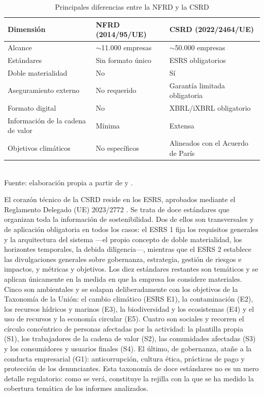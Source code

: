 \begin{table}[H]
\centering
\caption{Principales diferencias entre la NFRD y la CSRD}
\label{tab:nfrd-csrd}
\begin{tabular}{lll}
\toprule
\textbf{Dimensión} & \textbf{NFRD (2014/95/UE)} & \textbf{CSRD (2022/2464/UE)} \\
\midrule
Alcance & $\sim$11.000 empresas & $\sim$50.000 empresas \\
Estándares & Sin formato único & ESRS obligatorios \\
Doble materialidad & No & Sí \\
Aseguramiento externo & No requerido & Garantía limitada obligatoria \\
Formato digital & No & XBRL/iXBRL obligatorio \\
Información de la cadena de valor & Mínima & Extensa \\
Objetivos climáticos & No específicos & Alineados con el Acuerdo de París \\
\bottomrule
\end{tabular}
\\[4pt]
{\footnotesize Fuente: elaboración propia a partir de \textcite{nfrd2014} y \textcite{csrd2022}.}
\end{table}

El corazón técnico de la CSRD reside en los ESRS, aprobados mediante el Reglamento Delegado
(UE) 2023/2772 \parencite{esrs2023}. Se trata de doce estándares que organizan toda la
información de sostenibilidad. Dos de ellos son transversales y de aplicación obligatoria en
todos los casos: el ESRS 1 fija los requisitos generales y la arquitectura del sistema
—el propio concepto de doble materialidad, los horizontes temporales, la debida diligencia—,
mientras que el ESRS 2 establece las divulgaciones generales sobre gobernanza, estrategia,
gestión de riesgos e impactos, y métricas y objetivos. Los diez estándares restantes son
temáticos y se aplican únicamente en la medida en que la empresa los considere materiales.
Cinco son ambientales y se solapan deliberadamente con los objetivos de la Taxonomía de la
Unión: el cambio climático (ESRS E1), la contaminación (E2), los recursos hídricos y marinos
(E3), la biodiversidad y los ecosistemas (E4) y el uso de recursos y la economía circular
(E5). Cuatro son sociales y recorren el círculo concéntrico de personas afectadas por la
actividad: la plantilla propia (S1), los trabajadores de la cadena de valor (S2), las
comunidades afectadas (S3) y los consumidores y usuarios finales (S4). El último, de
gobernanza, atañe a la conducta empresarial (G1): anticorrupción, cultura ética, prácticas de
pago y protección de los denunciantes. Esta taxonomía de doce estándares no es un mero detalle
regulatorio: como se verá, constituye la rejilla con la que se ha medido la cobertura temática
de los informes analizados.

